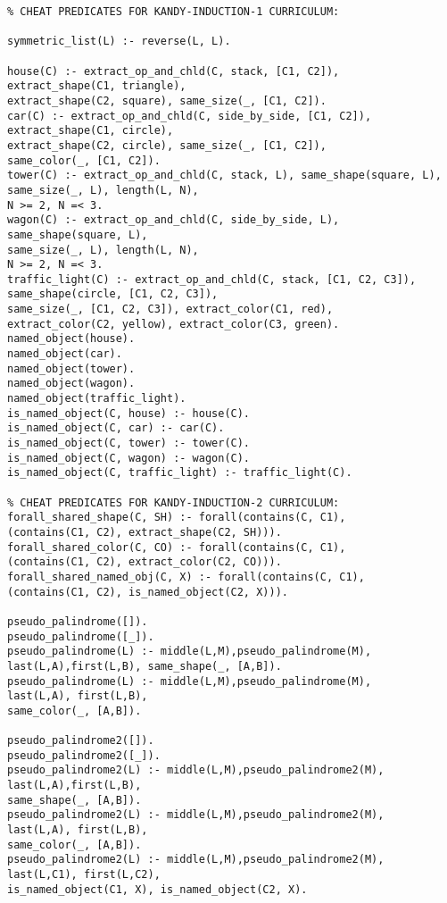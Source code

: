 \begin{verbatim}
% CHEAT PREDICATES FOR KANDY-INDUCTION-1 CURRICULUM:

symmetric_list(L) :- reverse(L, L).

house(C) :- extract_op_and_chld(C, stack, [C1, C2]), 
extract_shape(C1, triangle), 
extract_shape(C2, square), same_size(_, [C1, C2]).
car(C) :- extract_op_and_chld(C, side_by_side, [C1, C2]), 
extract_shape(C1, circle),
extract_shape(C2, circle), same_size(_, [C1, C2]), 
same_color(_, [C1, C2]).
tower(C) :- extract_op_and_chld(C, stack, L), same_shape(square, L), 
same_size(_, L), length(L, N), 
N >= 2, N =< 3.
wagon(C) :- extract_op_and_chld(C, side_by_side, L), 
same_shape(square, L), 
same_size(_, L), length(L, N), 
N >= 2, N =< 3.
traffic_light(C) :- extract_op_and_chld(C, stack, [C1, C2, C3]), 
same_shape(circle, [C1, C2, C3]), 
same_size(_, [C1, C2, C3]), extract_color(C1, red), 
extract_color(C2, yellow), extract_color(C3, green).
named_object(house).
named_object(car).
named_object(tower).
named_object(wagon).
named_object(traffic_light).
is_named_object(C, house) :- house(C).
is_named_object(C, car) :- car(C).
is_named_object(C, tower) :- tower(C).
is_named_object(C, wagon) :- wagon(C).
is_named_object(C, traffic_light) :- traffic_light(C).

% CHEAT PREDICATES FOR KANDY-INDUCTION-2 CURRICULUM:
forall_shared_shape(C, SH) :- forall(contains(C, C1), 
(contains(C1, C2), extract_shape(C2, SH))).
forall_shared_color(C, CO) :- forall(contains(C, C1), 
(contains(C1, C2), extract_color(C2, CO))).
forall_shared_named_obj(C, X) :- forall(contains(C, C1), 
(contains(C1, C2), is_named_object(C2, X))).

pseudo_palindrome([]).
pseudo_palindrome([_]).
pseudo_palindrome(L) :- middle(L,M),pseudo_palindrome(M),
last(L,A),first(L,B), same_shape(_, [A,B]).
pseudo_palindrome(L) :- middle(L,M),pseudo_palindrome(M),
last(L,A), first(L,B), 
same_color(_, [A,B]).

pseudo_palindrome2([]).
pseudo_palindrome2([_]).
pseudo_palindrome2(L) :- middle(L,M),pseudo_palindrome2(M),
last(L,A),first(L,B), 
same_shape(_, [A,B]).
pseudo_palindrome2(L) :- middle(L,M),pseudo_palindrome2(M),
last(L,A), first(L,B), 
same_color(_, [A,B]).
pseudo_palindrome2(L) :- middle(L,M),pseudo_palindrome2(M),
last(L,C1), first(L,C2), 
is_named_object(C1, X), is_named_object(C2, X).
	
\end{verbatim}

